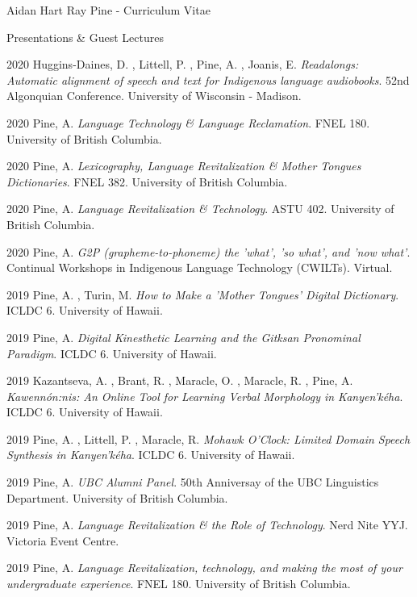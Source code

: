 \documentclass[12pt]{letter}
\begin{document}
\begin{cv}{ Aidan Hart Ray Pine  \space - \space   Curriculum Vitae}
        \begin{cvlist}{Presentations \& Guest Lectures}
                    \item[2020]  Huggins-Daines,  D. ,  Littell,  P. ,  Pine,  A. ,  Joanis,  E.   \textit{Readalongs: Automatic alignment of speech and text for Indigenous language audiobooks}. 52nd Algonquian Conference. University of Wisconsin - Madison.  
                    \item[2020]  Pine,  A.   \textit{Language Technology \& Language Reclamation}. FNEL 180. University of British Columbia.  
                    \item[2020]  Pine,  A.   \textit{Lexicography, Language Revitalization \& Mother Tongues Dictionaries}. FNEL 382. University of British Columbia.  
                    \item[2020]  Pine,  A.   \textit{Language Revitalization \& Technology}. ASTU 402. University of British Columbia.  
                    \item[2020]  Pine,  A.   \textit{G2P (grapheme-to-phoneme) the 'what', 'so what', and 'now what'}. Continual Workshops in Indigenous Language Technology (CWILTs). Virtual.  
                    \item[2019]  Pine,  A. ,  Turin,  M.   \textit{How to Make a 'Mother Tongues' Digital Dictionary}. ICLDC 6. University of Hawaii.  
                    \item[2019]  Pine,  A.   \textit{Digital Kinesthetic Learning and the Gitksan Pronominal Paradigm}. ICLDC 6. University of Hawaii.  
                    \item[2019]  Kazantseva,  A. ,  Brant,  R. ,  Maracle,  O. ,  Maracle,  R. ,  Pine,  A.   \textit{Kawenn{\'o}n:nis: An Online Tool for Learning Verbal Morphology in Kanyen'k{\'e}ha}. ICLDC 6. University of Hawaii.  
                    \item[2019]  Pine,  A. ,  Littell,  P. ,  Maracle,  R.   \textit{Mohawk O'Clock: Limited Domain Speech Synthesis in Kanyen'k{\'e}ha}. ICLDC 6. University of Hawaii.  
                    \item[2019]  Pine,  A.   \textit{UBC Alumni Panel}. 50th Anniversay of the UBC Linguistics Department. University of British Columbia.  
                    \item[2019]  Pine,  A.   \textit{Language Revitalization \& the Role of Technology}. Nerd Nite YYJ. Victoria Event Centre.  
                    \item[2019]  Pine,  A.   \textit{Language Revitalization, technology, and making the most of your undergraduate experience}. FNEL 180. University of British Columbia.  

\end{cvlist}
\end{cv}
\end{document}
